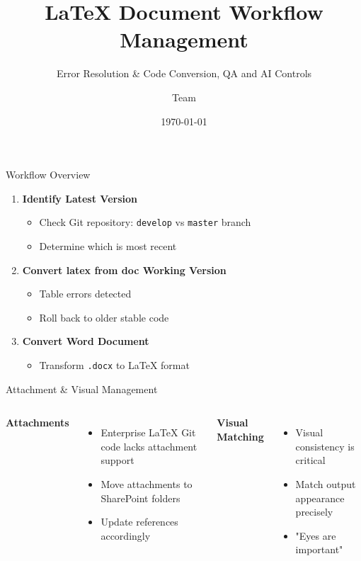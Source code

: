 \documentclass{beamer}
\title{LaTeX Document Workflow Management}
\subtitle{Error Resolution \& Code Conversion, QA and AI Controls}
\author{Team}
\date{\today}
\begin{document}
	
	\begin{frame}
		\titlepage
	\end{frame}
	
	\begin{frame}{Workflow Overview}
		\begin{enumerate}
			\item \textbf{Identify Latest Version}
			\begin{itemize}
				\item Check Git repository: \texttt{develop} vs \texttt{master} branch
				\item Determine which is most recent
			\end{itemize}
			\item \textbf{Convert latex from doc  Working Version}
			\begin{itemize}
				\item Table errors detected
				\item Roll back to older stable code
			\end{itemize}
			\item \textbf{Convert Word Document}
			\begin{itemize}
				\item Transform \texttt{.docx} to \LaTeX{} format
			\end{itemize}
		\end{enumerate}
	\end{frame}
	
	\begin{frame}{Attachment \& Visual Management}
		\begin{columns}
			\column{0.5\textwidth}
			\textbf{Attachments}
			\begin{itemize}
				\item Enterprise \LaTeX{} Git code lacks attachment support
				\item Move attachments to SharePoint folders
				\item Update references accordingly
			\end{itemize}
			\column{0.5\textwidth}
			\textbf{Visual Matching}
			\begin{itemize}
				\item Visual consistency is critical
				\item Match output appearance precisely
				\item "Eyes are important"
			\end{itemize}
		\end{columns}
	\end{frame}
	
\end{document}
